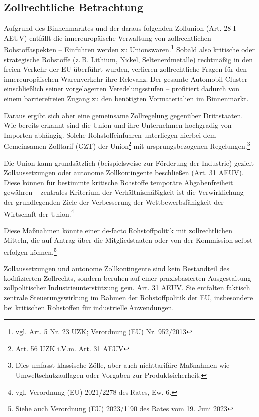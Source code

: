 \documentclass[12pt,a4paper,oneside]{book} %
\begin{document}
\subsection{Zollrechtliche Betrachtung}
Aufgrund des Binnenmarktes und der daraus folgenden Zollunion (Art. 28 I AEUV) entfällt die innereuropäische Verwaltung von zollrechtlichen Rohstoffaspekten -- Einfuhren werden zu \glqq Unionswaren\grqq.\footnote{vgl. Art. 5 Nr. 23 UZK; Verordnung (EU) Nr. 952/2013} Sobald also kritische oder strategische Rohstoffe (z. B. Lithium, Nickel, Seltenerdmetalle) rechtmäßig in den freien Verkehr der EU überführt wurden, verlieren zollrechtliche Fragen für den innereuropäischen Warenverkehr ihre Relevanz. Der gesamte Automobil-Cluster – einschließlich seiner vorgelagerten Veredelungsstufen – profitiert dadurch von einem barrierefreien Zugang zu den benötigten Vormaterialien im Binnenmarkt.

Daraus ergibt sich aber eine gemeinsame Zollregelung gegenüber Drittstaaten. Wie bereits erkannt sind die Union und ihre Unternehmen hochgradig von Importen abhängig. Solche Rohstoffeinfuhren unterliegen hierbei dem Gemeinsamen Zolltarif (GZT) der Union\footnote{Art. 56 UZK i.V.m. Art. 31 AEUV} mit ursprungsbezogenen Regelungen.\footnote{Dies umfasst klassische Zölle, aber auch nichttarifäre Maßnahmen wie Umweltschutzauflagen oder Vorgaben zur Produktsicherheit.}

Die Union kann grundsätzlich (beispielsweise zur Förderung der Industrie) gezielt Zollaussetzungen oder autonome Zollkontingente beschließen (Art. 31 AEUV). Diese können für bestimmte kritische Rohstoffe temporäre Abgabenfreiheit gewähren -- zentrales Kriterium der Verhältnismäßigkeit ist die Verwirklichung der grundlegenden Ziele der Verbesserung der Wettbewerbsfähigkeit der Wirtschaft der Union.\footnote{vgl. Verordnung (EU) 2021/2278 des Rates, Ew. 6.}

Diese Maßnahmen könnte einer de-facto Rohstoffpolitik mit zollrechtlichen Mitteln, die auf Antrag über die Mitgliedstaaten oder von der Kommission selbst erfolgen können.\footnote{Siehe auch Verordnung (EU) 2023/1190 des Rates vom 19. Juni 2023}

Zollaussetzungen und autonome Zollkontingente sind kein Bestandteil des kodifizierten Zollrechts, sondern beruhen auf einer praxisbasierten Ausgestaltung zollpolitischer Industrieunterstützung gem. Art. 31 AEUV. Sie entfalten faktisch zentrale Steuerungswirkung im Rahmen der Rohstoffpolitik der EU, insbesondere bei kritischen Rohstoffen für industrielle Anwendungen.
\end{document}
